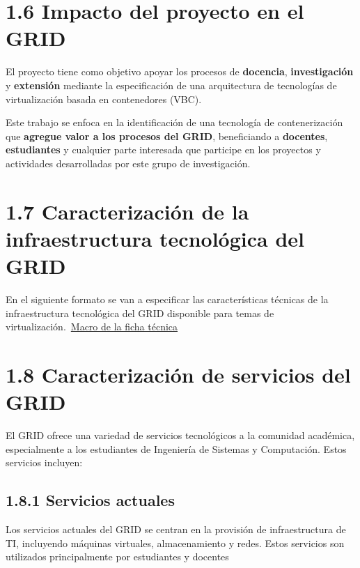 \section*{1.6 Impacto del proyecto en el GRID}

El proyecto tiene como objetivo apoyar los procesos de \textbf{docencia}, \textbf{investigación} 
y \textbf{extensión} mediante la especificación de una arquitectura de tecnologías de 
virtualización basada en contenedores (VBC). 

Este trabajo se enfoca en la identificación de una tecnología de contenerización que 
\textbf{agregue valor a los procesos del GRID}, beneficiando a \textbf{docentes}, \textbf{estudiantes} 
y cualquier parte interesada que participe en los proyectos y actividades desarrolladas 
por este grupo de investigación.

\section*{1.7 Caracterización de la infraestructura tecnológica del GRID}
En el siguiente formato se van a especificar las características técnicas de la infraestructura tecnológica del GRID disponible para temas de virtualización.\ \href{https://docs.google.com/spreadsheets/d/14NBv72ucVTrLqGIldYdIsjdBGt3QlgwcblcVRis-DaQ/edit?usp=sharing}{Macro de la ficha técnica}


\section*{1.8 Caracterización de servicios del GRID}
El GRID ofrece una variedad de servicios tecnológicos a la comunidad académica, especialmente a los estudiantes de Ingeniería de Sistemas y Computación. Estos servicios incluyen:

\subsection*{1.8.1 Servicios actuales}
Los servicios actuales del GRID se centran en la provisión de infraestructura de TI, incluyendo máquinas virtuales, almacenamiento y redes. Estos servicios son utilizados principalmente por estudiantes y docentes

